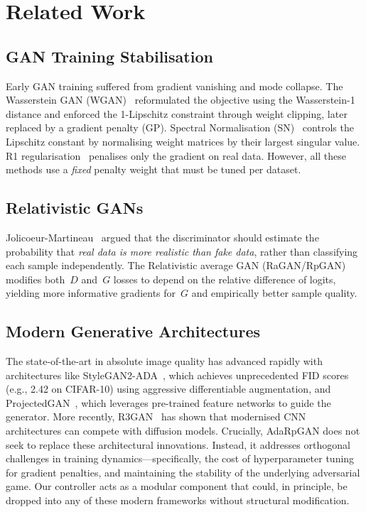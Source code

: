 \documentclass{article}
\begin{document}
\section{Related Work}
\label{sec:related}

\subsection{GAN Training Stabilisation}

Early GAN training suffered from gradient vanishing and mode collapse. The Wasserstein GAN (WGAN)~\cite{gulrajani2017improved} reformulated the objective using the Wasserstein-1 distance and enforced the 1-Lipschitz constraint through weight clipping, later replaced by a gradient penalty (GP). Spectral Normalisation (SN)~\cite{miyato2018spectral} controls the Lipschitz constant by normalising weight matrices by their largest singular value. R1 regularisation~\cite{mescheder2018training} penalises only the gradient on real data. However, all these methods use a \emph{fixed} penalty weight that must be tuned per dataset.

\subsection{Relativistic GANs}

Jolicoeur-Martineau~\cite{jolicoeur2019relativistic} argued that the discriminator should estimate the probability that \emph{real data is more realistic than fake data}, rather than classifying each sample independently. The Relativistic average GAN (RaGAN/RpGAN) modifies both~$D$ and~$G$ losses to depend on the relative difference of logits, yielding more informative gradients for~$G$ and empirically better sample quality.

\subsection{Modern Generative Architectures}

The state-of-the-art in absolute image quality has advanced rapidly with architectures like StyleGAN2-ADA~\cite{karras2020training}, which achieves unprecedented FID scores (e.g., 2.42 on CIFAR-10) using aggressive differentiable augmentation, and ProjectedGAN~\cite{sauer2021projected}, which leverages pre-trained feature networks to guide the generator. More recently, R3GAN~\cite{kancharla2025r3gan} has shown that modernised CNN architectures can compete with diffusion models. 
Crucially, AdaRpGAN does not seek to replace these architectural innovations. Instead, it addresses orthogonal challenges in training dynamics---specifically, the cost of hyperparameter tuning for gradient penalties, and maintaining the stability of the underlying adversarial game. Our controller acts as a modular component that could, in principle, be dropped into any of these modern frameworks without structural modification.
\end{document}
